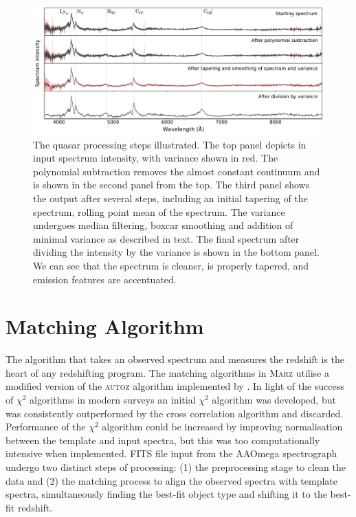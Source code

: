\documentclass[5p]{elsarticle}
\newcommand{\autoz}{\textsc{autoz}}
\newcommand{\marz}{\textsc{Marz}}
\begin{document}
\begin{figure}
\centering
\includegraphics[width=\textwidth]{quasarProcess.pdf}
\caption{The quasar processing steps illustrated. The top panel depicts in input spectrum intensity, with variance shown in red. The polynomial subtraction removes the almost constant continuum and is shown in the second panel from the top. The third panel shows the output after several steps, including an initial tapering of the spectrum, rolling point mean of the spectrum. The variance undergoes median filtering, boxcar smoothing and addition of minimal variance as described in text. The final spectrum after dividing the intensity by the variance is shown in the bottom panel. We can see that the spectrum is cleaner, is properly tapered, and emission features are accentuated.}
\label{fig:quasarProcess}
\end{figure}



\section{Matching Algorithm} \label{sec:algorithm}

The algorithm that takes an observed spectrum and measures the redshift is the heart of any redshifting program. The matching algorithms in \marz{} utilise a modified version of the \autoz{} algorithm implemented by \citet{baldry2014galaxy}. In light of the success of $\chi^2$ algorithms in modern surveys \citep{bolton2012} an initial $\chi^2$ algorithm was developed, but was consistently outperformed by the cross correlation algorithm and discarded. Performance of the $\chi^2$ algorithm could be increased by improving normalisation between the template and input spectra, but this was too computationally intensive when implemented. FITS file input from the AAOmega spectrograph undergo two distinct steps of processing: (1) the preprocessing stage to clean the data and (2) the matching process to align the observed spectra with template spectra, simultaneously finding the best-fit object type and shifting it to the best-fit redshift.
\end{document}
